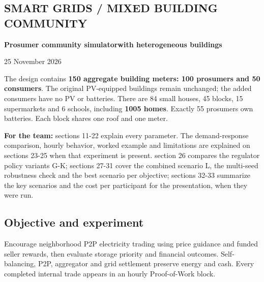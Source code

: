 \documentclass[a4paper,11pt]{article}
\begin{document}
\subsection*{SMART GRIDS / MIXED BUILDING COMMUNITY}
\par\medskip

{\LARGE\bfseries Prosumer community simulator\newline{}with heterogeneous buildings\par}\medskip
\par\medskip

{\small 25 November 2026\par}
\par\medskip

The design contains \textbf{150 aggregate building meters: 100 prosumers and 50 consumers}. The original PV-equipped buildings remain unchanged; the added consumers have no PV or batteries. There are 84 small houses, 45 blocks, 15 supermarkets and 6 schools, including \textbf{1005 homes}. Exactly 55 prosumers own batteries. Each block shares one roof and one meter.
\par\medskip

{\small \textbf{For the team:} sections 11-22 explain every parameter. The demand-response comparison, hourly behavior, worked example and limitations are explained on sections 23-25 when that experiment is present. section 26 compares the regulator policy variants G-K; sections 27-31 cover the combined scenario L, the multi-seed robustness check and the best scenario per objective; sections 32-33 summarize the key scenarios and the cost per participant for the presentation, when they were run.\par}
\par\medskip

\subsection*{Objective and experiment}
\par\medskip

Encourage neighborhood P2P electricity trading using price guidance and funded seller rewards, then evaluate storage priority and financial outcomes. Self-balancing, P2P, aggregator and grid settlement preserve energy and cash. Every completed internal trade appears in an hourly Proof-of-Work block.
\par\medskip
\end{document}
